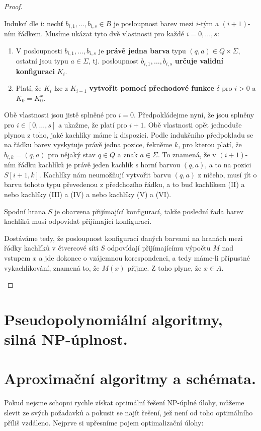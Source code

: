 \documentclass[11pt]{report} %
\begin{document}
\begin{proof}
\begin{description}
	Indukcí dle i: nechť $b_{i,1}, \dots, b_{i,s} \in B$ je posloupnost barev mezi $i$-tým a $(i+1)$-ním řádkem. Musíme ukázat tyto dvě vlastnosti pro každé $i = 0, \dots, s$:
	\begin{enumerate}
		\leftskip 40pt
		\setlength{\itemsep}{0pt}
		\item V posloupnosti $b_{i,1}, \dots, b_{i,s}$ je \textbf{právě jedna barva} typu $(q, a) \in Q \times \Sigma$, ostatní jsou typu $a \in \Sigma$, tj. posloupnost $b_{i,1}, \dots, b_{i,s}$ \textbf{určuje validní konfiguraci} $K_i$.
		\item Platí, že $K_i$ lze z $K_{i-1}$ \textbf{vytvořit pomocí přechodové funkce} $\delta$ pro $i > 0$ a $K_0 = K_0^x$.
	\end{enumerate}

	Obě vlastnosti jsou jistě splněné pro $i = 0$. Předpokládejme nyní, že jsou splněny pro $i \in [0, \dots, s]$ a ukažme, že platí pro $i + 1$. Obě vlastnosti opět jednoduše plynou z toho, jaké kachlíky máme k dispozici. Podle indukčního předpokladu se na řádku barev vyskytuje právě jedna pozice, řekněme $k$, pro kterou platí, že $b_{i,k} = (q, a)$ pro nějaký stav $q \in Q$ a znak $a \in \Sigma$. To znamená, že v $(i + 1)$-ním řádku kachlíků je právě jeden kachlík s horní barvou $(q, a)$, a to na pozici $S[i+1, k]$. Kachlíky nám neumožňují vytvořit barvu $(q, a)$ z ničeho, musí jít o barvu tohoto typu převedenou z předchozího řádku, a to buď kachlíkem (II) a nebo kachlíky (III) a (IV) a nebo kachlíky (V) a (VI).

	Spodní hrana $S$ je obarvena přijímající konfigurací, takže poslední řada barev kachlíků musí
	odpovídat přijímající konfiguraci. 
	
	Dostáváme tedy, že posloupnost konfigurací daných barvami na hranách mezi řádky kachlíků v čtvercové síti $S$ odpovídají přijímajícímu výpočtu $M$ nad vstupem $x$ a jde dokonce o vzájemnou korespondenci, a tedy máme-li přípustné vykachlíkování, znamená to, že $M(x)$ přijme. Z toho plyne, že $x \in A.$
\end{description}


\end{proof}

\section{Pseudopolynomiální algoritmy, silná NP-úplnost.}


\section{Aproximační algoritmy a schémata.}
Pokud nejsme schopni rychle získat optimální řešení NP-úplné úlohy, můžeme slevit ze svých požadavků a pokusit se najít řešení, jež není od toho optimálního příliš vzdáleno. Nejprve si upřesníme pojem optimalizační úlohy:
\end{document}
